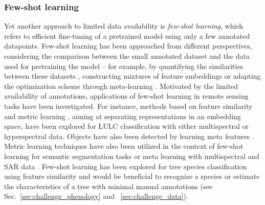 \documentclass{CUP-JNL-DTM}%
\theoremstyle{definition}
\numberwithin{equation}{section}
\begin{document}
\subsubsection{Few-shot learning}
\label{sec:ml_fewshot}
Yet another approach to limited data availability is \emph{few-shot learning}, which refers to efficient fine-tuning of a pretrained model using only a few annotated datapoints.
%
Few-shot learning has been approached from different perspectives, considering the comparison between the small annotated dataset and the data used for pretraining the model -- for example, by quantifying the similarities between these datasets \cite{vinyals_matching_2016}, constructing mixtures of feature embeddings \cite{snell_prototypical_2017} or adapting the optimization scheme through meta-learning \cite{finn_model-agnostic_2017}.
%
Motivated by the limited availability of annotations, applications of few-shot learning in remote sensing tasks have been investigated. 
For instance, methods based on feature similarity \cite{zhang_few-shot_2020, alajaji_few-shot_2020, alosaimi_self-supervised_2023} and metric learning \cite{liu_deep_2019}, aiming at separating representations in an embedding space, have been explored for LULC classification with either multispectral or hyperspectral data.
%
Objects have also been detected by learning meta features \cite{deng_few-shot_2022}.
%
Metric learning techniques have also been utilized in the context of few-shot learning for semantic segmentation tasks \cite{jiang_few-shot_2022} or meta learning with multispectral and SAR data \cite{ruswurm_meta-learning_2020}.
%
Few-shot learning has been explored for tree species classification using feature similarity \cite{chen_new_2021} and would be beneficial to recognize a species or estimate the characteristics of a tree with minimal manual annotations (see Sec.~\ref{sec:challenge_phenology} and ~\ref{sec:challenge_data}).
\end{document}
